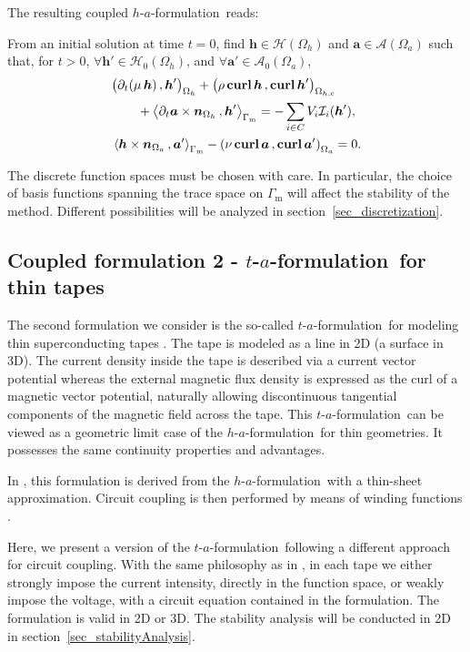 \documentclass[journal]{IEEEtran}
\renewcommand{\vec}[1]{\boldsymbol{#1}} %
\newcommand{\paren}[1]{\left(#1\right)}
\newcommand{\parenangle}[1]{\left\langle#1\right\rangle}
\newcommand{\volInt}[3]{\paren{#1 \, , #2}_{#3}}
\newcommand{\volIntBig}[3]{\big(#1 \, , #2\big)_{#3}}
\newcommand{\surInt}[3]{\parenangle{#1 \, , #2}_{#3}}
\newcommand{\curl}{\text{\textbf{curl}}\, }
\renewcommand{\a}{\vec a}
\newcommand{\h}{\vec h}
\newcommand{\dt}{\partial_t}
\newcommand{\Oa}{\Omega_a}
\newcommand{\Oh}{\Omega_h}
\newcommand{\Ohc}{\Omega_{h,\text{c}}}
\newcommand{\Gm}{\Gamma_\text{m}}
\newcommand{\haf}{$h$-$a$-formulation\ }
\newcommand{\taf}{$t$-$a$-formulation\ }
\newcommand{\hsp}{\mathcal{H}}
\newcommand{\asp}{\mathcal{A}}
\newcommand{\hspz}{\mathcal{H}_{0}}
\newcommand{\aspz}{\mathcal{A}_{0}}
\begin{document}
The resulting coupled \haf reads:

From an initial solution at time $t=0$, find $\h \in \hsp(\Oh)$ and $\a\in \asp(\Oa)$ such that, for $t>0$, $\forall \h' \in \hspz(\Oh)$, and $\forall \a' \in \aspz(\Oa)$,
\begin{equation}\label{eqn_coupledFormulation}
\begin{aligned}
& \volIntBig{\dt (\mu\, \h)}{\h'}{\Oh} + \volIntBig{\rho\,  \curl \h}{\curl \h'}{\Ohc}\\
& \qquad  + \surInt{\dt \a \times\vec n_{\Oh}}{\h'}{\Gamma_\text{m}}= -\sum_{i\in C} V_i \mathcal{I}_i(\h'),\\
&\surInt{\h\times\vec n_{\Oa}}{\a'}{\Gamma_\text{m}} - \volInt{\nu\, \curl \a}{\curl \a'}{\Oa} = 0.
\end{aligned}
\end{equation}

The discrete function spaces must be chosen with care. In particular, the choice of basis functions spanning the trace space on $\Gm$ will affect the stability of the method. Different possibilities will be analyzed in section~\ref{sec_discretization}.

\subsection{Coupled formulation 2 - \taf for thin tapes}

The second formulation we consider is the so-called \taf for modeling thin superconducting tapes \cite{zhang2016efficient}. The tape is modeled as a line in 2D (a surface in 3D). The current density inside the tape is described via a current vector potential whereas the external magnetic flux density is expressed as the curl of a magnetic vector potential, naturally allowing discontinuous tangential components of the magnetic field across the tape. This \taf can be viewed as a geometric  limit case of the \haf for thin geometries. It possesses the same continuity properties and advantages.

In \cite{Bortot}, this formulation is derived from the \haf with a thin-sheet approximation. Circuit coupling is then performed by means of winding functions \cite{schops2013winding}.

Here, we present a version of the \taf following a different approach for circuit coupling. With the same philosophy as in \cite{dular1999global}, in each tape we either strongly impose the current intensity, directly in the function space, or weakly impose the voltage, with a circuit equation contained in the formulation. The formulation is valid in 2D or 3D. The stability analysis will be conducted in 2D in section~\ref{sec_stabilityAnalysis}.
\end{document}
